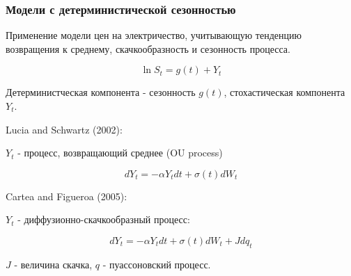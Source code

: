 \documentclass[c, dvipsnames]{beamer}  %
\begin{document}
\begin{frame}[shrink=5]
\frametitle{Модели с детерминистической сезонностью} 

Применение  модели цен на электричество,  учитывающую тенденцию возвращения к среднему, скачкообразность и сезонность процесса.


$$\ln S_t = g(t) +Y_t$$

Детерминистческая компонента - сезонность $g(t)$, стохастическая компонента $Y_t$.


\begin{block}{Lucia and Schwartz (2002): }
	
	$Y_t$ - процесс, возвращающий среднее (OU process)
	
	$$dY_t = -\alpha Y_t dt + \sigma(t) dW_t$$
	
	
	
	
\end{block}



\begin{block}{Cartea and Figueroa (2005): }
	
	
	$Y_t$ - диффузионно-скачкообразный процесс:
	
	$$dY_t = -\alpha Y_t dt + \sigma(t) dW_t + J dq_t$$
	
	$J$ - величина скачка, $q$ - пуассоновский процесс.
	
	
	
	
\end{block}




\end{frame}
\end{document}
